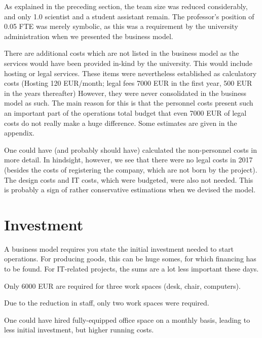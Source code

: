 \documentclass[output=guidelines,nonflat,smallfont,
draftmode
]{langsci/langscibook}
\newcommand{\background}[1]{ 
  \vspace{5mm}
  \renewcommand{\tblslinecolour}{lsDarkBlue}
  \tblssy[red]{explore2}{Background}{\vspace*{-5mm}#1}
}
\newcommand{\langscisolution}[1]{
  \renewcommand{\tblslinecolour}{lsLightBlue}
  \tblssy{langsci}{LangSci solution}{\vspace*{-5mm}#1}
}
\newcommand{\evaluation}[1]{
  \renewcommand{\tblslinecolour}{lsLightOrange}
  \tblssy{receipt}{Evaluation}{\vspace*{-5mm}#1}
}
\newcommand{\othersolutions}[1]{
  \renewcommand{\tblslinecolour}{lsDarkGreenOne}
  \tblssy{more}{Other solutions}{\vspace*{-5mm}#1}
}
\renewcommand{\tblssy}[4][black!12]{%
  \renewcommand{\langscisymbol}{#2}\renewcommand{\tblsboxcolor}{#1}
  \begin{mdframed}[style=yellowexercise,frametitle={#3}]
    #4
  \end{mdframed}
}
\begin{document}
\evaluation{As explained in the preceding section, the team size was reduced considerably, and only 1.0 scientist and a student assistant remain. The professor's position of 0.05 FTE was merely symbolic, as this was a requirement by the university administration when we presented the business model. 

There are additional costs which are not listed in the business model as the services would have been provided in-kind by the university. This would include hosting or legal services. These items were nevertheless established as calculatory costs (Hosting 120 EUR/month; legal fees 7000 EUR in the first year, 500 EUR in the years thereafter) However, they were never consolidated in the business model as such. The main reason for this is that the personnel costs present such an important part of the operations total budget that even 7000 EUR of legal costs do not really make a huge difference. Some estimates are given in the appendix. 
}
\othersolutions{
One could have (and probably should have) calculated the non-personnel costs in more detail.  In hindsight, however, we see that there were no legal costs in 2017 (besides the costs of registering the company, which are not born by the project). The design costs and IT costs, which were budgeted, were also not needed.  This is probably a sign of rather conservative estimations when we devised the model. 
}
  

\section{Investment}

\background{A business model requires you state the initial investment needed to start operations. For producing goods, this can be huge somes, for which financing has to be found. For IT-related projects, the sums are a lot less important these days.}
\langscisolution{
Only 6000 EUR are required for three work spaces (desk, chair, computers). 
}
\evaluation{Due to the reduction in staff, only two work spaces were required.}
\othersolutions{
One could have hired fully-equipped office space on a monthly basis, leading to less initial investment, but higher running costs. 
}
 

% 
%  
% 
% 
%  
\end{document}
